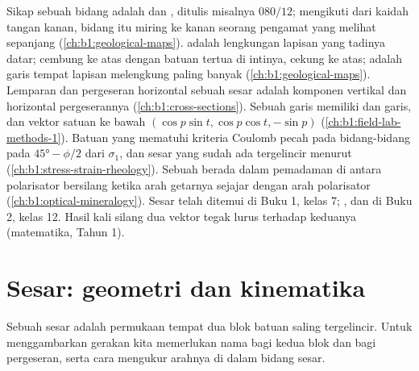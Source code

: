 \begin{recall}
Sikap sebuah bidang adalah  dan , ditulis misalnya $080/12$;  mengikuti dari kaidah tangan kanan, bidang itu miring ke kanan seorang pengamat yang melihat sepanjang  (\cref{ch:b1:geological-maps}).  adalah lengkungan lapisan yang tadinya datar;  cembung ke atas dengan batuan tertua di intinya,  cekung ke atas;  adalah garis tempat lapisan melengkung paling banyak (\cref{ch:b1:geological-maps}). Lemparan dan pergeseran horizontal sebuah sesar adalah komponen vertikal dan horizontal pergeserannya (\cref{ch:b1:cross-sections}). Sebuah garis memiliki  dan  garis, dan vektor satuan ke bawah $(\cos p\sin t, \cos p\cos t, -\sin p)$ (\cref{ch:b1:field-lab-methods-1}). Batuan yang mematuhi kriteria Coulomb pecah pada bidang-bidang pada $\ang{45} - \phi/2$ dari $\sigma_1$, dan sesar yang sudah ada tergelincir menurut  (\cref{ch:b1:stress-strain-rheology}). Sebuah  berada dalam pemadaman di antara polarisator bersilang ketika arah getarnya sejajar dengan arah polarisator (\cref{ch:b1:optical-mineralogy}). Sesar telah ditemui di Buku 1, kelas 7; ,  dan  di Buku 2, kelas 12. Hasil kali silang dua vektor tegak lurus terhadap keduanya (matematika, Tahun 1).
\end{recall}

\section{Sesar: geometri dan kinematika}\label{sec:b1:faults-folds-fabrics:faults}

Sebuah sesar adalah permukaan tempat dua blok batuan saling tergelincir. Untuk menggambarkan gerakan kita memerlukan nama bagi kedua blok dan bagi pergeseran, serta cara mengukur arahnya di dalam bidang sesar.

